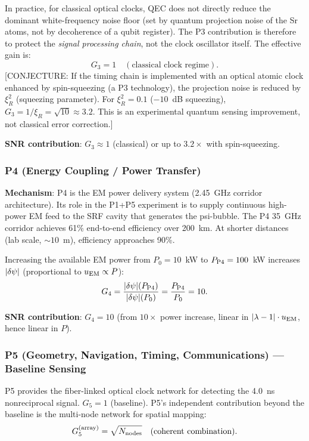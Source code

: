 In practice, for classical optical clocks, QEC does not directly reduce
the dominant white-frequency noise floor (set by quantum projection noise of
the Sr atoms, not by decoherence of a qubit register). The P3 contribution
is therefore to protect the \emph{signal processing chain}, not the clock
oscillator itself. The effective gain is:
\begin{equation}
G_3 = 1 \quad (\text{classical clock regime}).
\label{eq:G3_classical}
\end{equation}
\textcolor{conjcolor}{[CONJECTURE: If the timing chain is implemented with
an optical atomic clock enhanced by spin-squeezing (a P3 technology),
the projection noise is reduced by $\xi_R^2$ (squeezing parameter). For
$\xi_R^2 = 0.1$ ($-10$~dB squeezing), $G_3 = 1/\xi_R = \sqrt{10} \approx 3.2$.
This is an experimental quantum sensing improvement, not classical error
correction.]}

\textbf{SNR contribution}: $G_3 \approx 1$ (classical) or up to $3.2\times$
with spin-squeezing.

\subsubsection*{P4 (Energy Coupling / Power Transfer)}

\textbf{Mechanism}: P4 is the EM power delivery system (2.45~GHz corridor
architecture). Its role in the P1+P5 experiment is to supply continuous
high-power EM feed to the SRF cavity that generates the psi-bubble. The P4
35~GHz corridor achieves 61\% end-to-end efficiency over 200~km. At shorter
distances (lab scale, $\sim 10$~m), efficiency approaches 90\%.

Increasing the available EM power from $P_0 = 10$~kW to $P_{\rm P4}
= 100$~kW increases $|\delta\psi|$ (proportional to $u_{\rm EM} \propto P$):
\begin{equation}
G_4 = \frac{|\delta\psi|(P_{\rm P4})}{|\delta\psi|(P_0)} = \frac{P_{\rm P4}}{P_0} = 10.
\label{eq:G4}
\end{equation}

\textbf{SNR contribution}: $G_4 = 10$ (from $10\times$ power increase, linear
in $|\lambda - 1| \cdot u_{\rm EM}$, hence linear in $P$).

\subsubsection*{P5 (Geometry, Navigation, Timing, Communications) --- Baseline Sensing}

P5 provides the fiber-linked optical clock network for detecting the 4.0~ns
nonreciprocal signal. $G_5 = 1$ (baseline). P5's independent contribution
beyond the baseline is the multi-node network for spatial mapping:
\begin{equation}
G_5^{(\rm array)} = \sqrt{N_{\rm nodes}} \quad (\text{coherent combination}).
\label{eq:G5_array}
\end{equation}

